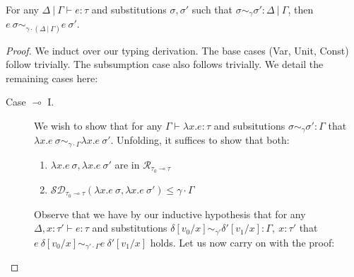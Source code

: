 \begin{theorem}
  For any $\Delta \ | \ \Gamma \vdash e : \tau$ and substitutions $\sigma, \sigma'$ such that
  $\sigma \sim_{\gamma} \sigma' : \Delta \ | \ \Gamma$, then 
  $e~\sigma \sim_{\gamma \cdot (\Delta \ | \ \Gamma)} e~\sigma'$.
\end{theorem}
\begin{proof}
  We induct over our typing derivation. The base cases (Var, Unit, Const) follow
  trivially. The subsumption case also follows trivially. We detail the
  remaining cases here:
  \begin{description}
    \item[Case $\multimap$ I.] 
      We wish to show that for any $\Gamma \vdash \lambda x . e : \tau$ and
      subsitutions $\sigma \sim_{\gamma} \sigma' : \Gamma$ that $\lambda x .
      e~\sigma \sim_{\gamma \cdot \Gamma} \lambda x . e~\sigma'$. Unfolding, it
      suffices to show that both:
      \begin{enumerate}
        \item $\lambda x . e~\sigma, \lambda x . e~\sigma'$ are in
          $\mathcal{R}_{\tau_0 \multimap \tau}$
        \item $\mathcal{SD}_{\tau_0 \multimap \tau}(\lambda x . e~\sigma,
          \lambda x . e~\sigma') \leq \gamma \cdot \Gamma$
      \end{enumerate}
    
      Observe that we have by our inductive hypothesis that for any $\Delta, x:
      \tau' \vdash e : \tau$ and substitutions 
      $\delta[v_0/x] \sim_{\gamma'} \delta'[v_1/x] : \Gamma,~x : \tau'$ that 
      $e~\delta[v_0/x] \sim_{\gamma' \cdot \Gamma} e~\delta'[v_1/x]$ holds. 
      Let us now carry on with the proof:


\end{description}
\end{proof}
